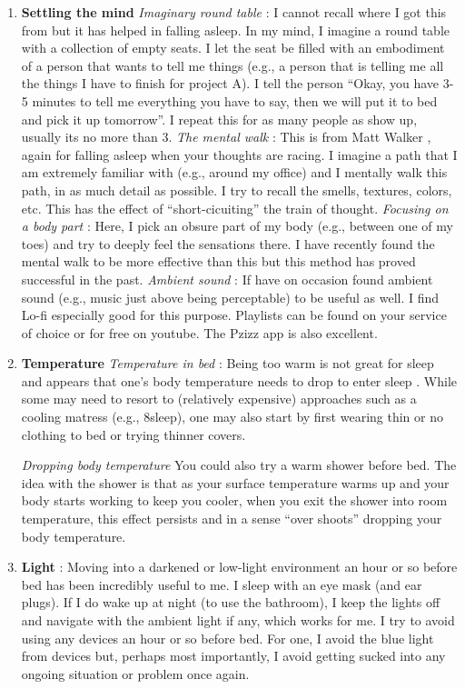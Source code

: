 \documentclass[10pt,twocolumn]{extarticle}
\begin{document}
\begin{enumerate}
    \item{\textbf{Settling the mind}}
    \subitem \textit{Imaginary round table} : I cannot recall where I got this from but it has helped in falling asleep. In my mind, I imagine a round table with a collection of empty seats. I let the seat be filled with an embodiment of a person that wants to tell me things (e.g., a person that is telling me all the things I have to finish for project A). I tell the person ``Okay, you have 3-5 minutes to tell me everything you have to say, then we will put it to bed and pick it up tomorrow''. I repeat this for as many people as show up, usually its no more than 3. 
    \subitem \textit{The mental walk} : This is from Matt Walker \cite{huberman_walker_2024}, again for falling asleep when your thoughts are racing. I imagine a path that I am extremely familiar with (e.g., around my office) and I mentally walk this path, in as much detail as possible. I try to recall the smells, textures, colors, etc. This has the effect of ``short-cicuiting'' the train of thought.
    \subitem \textit{Focusing on a body part} : Here, I pick an obsure part of my body (e.g., between one of my toes) and try to deeply feel the sensations there. I have recently found the mental walk to be more effective than this but this method has proved successful in the past.
    \subitem \textit{Ambient sound} : If have on occasion found ambient sound (e.g., music just above being perceptable) to be useful as well. I find Lo-fi especially good for this purpose. Playlists can be found on your service of choice or for free on youtube. The Pzizz app \cite{pzizz} is also excellent.
    \item{\textbf{Temperature}}
    \subitem \textit{Temperature in bed} : Being too warm is not great for sleep and appears that one's body temperature needs to drop to enter sleep \cite{youtube_sleep_walker}. While some may need to resort to (relatively expensive) approaches such as a cooling matress (e.g., 8sleep), one may also start by first wearing thin or no clothing to bed or trying thinner covers. 
    
    \subitem\textit{Dropping body temperature} You could also try a warm shower before bed. The idea with the shower is that as your surface temperature warms up and your body starts working to keep you cooler, when you exit the shower into room temperature, this effect persists and in a sense ``over shoots'' dropping your body temperature.

    \item{\textbf{Light}} : 
     Moving into a darkened or low-light environment an hour or so before bed has been incredibly useful to me. I sleep with an eye mask (and ear plugs). If I do wake up at night (to use the bathroom), I keep the lights off and navigate with the ambient light if any, which works for me.
     I try to avoid using any devices an hour or so before bed. For one, I avoid the blue light from devices but, perhaps most importantly, I avoid getting sucked into any ongoing situation or problem once again.


\end{enumerate}
\end{document}
